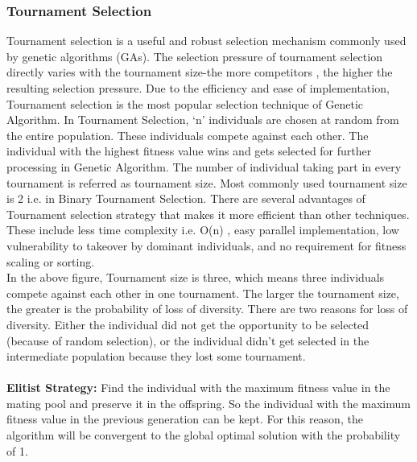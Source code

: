 \documentclass[a4paper, 12pt]{article}
\begin{document}
\subsubsection{Tournament Selection}
Tournament selection is a useful and robust selection mechanism commonly used by genetic algorithms (GAs). The selection pressure of
tournament selection directly varies with the tournament size-the more competitors , the higher the resulting selection pressure. Due to the 
efficiency and ease of implementation, Tournament selection is the most popular selection technique of Genetic Algorithm. In Tournament 
Selection, ‘n’ individuals are chosen at random from the entire population. These individuals compete against each other. The individual with 
the highest fitness value wins and gets selected for further processing in Genetic Algorithm. The number of individual taking part in every 
tournament is referred as tournament size. Most commonly used tournament size is 2 i.e. in Binary Tournament Selection. There are several advantages of Tournament selection strategy that makes it more efficient than other techniques. These include less time complexity i.e. O(n) , easy 
parallel implementation, low vulnerability to takeover by dominant individuals, and no requirement for fitness scaling or sorting.\\
In the above figure, Tournament size is three, which means three individuals compete against each other in one tournament. The larger the 
tournament size, the greater is the probability of loss of diversity. There are two reasons for loss of diversity. Either the individual did 
not get the opportunity to be selected (because of random selection), or the individual didn’t get selected in the intermediate population 
because they lost some tournament.\\
\\\textbf{Elitist Strategy:}
Find the individual with the maximum fitness value in the mating pool and preserve it in the offspring. So the individual with the maximum 
fitness value in the previous generation can be kept. For this reason, the algorithm will be convergent to the global optimal solution with the
probability of 1.
\end{document}
